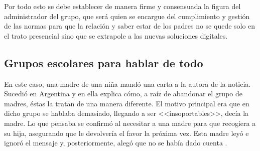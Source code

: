 Por todo esto se debe establecer de manera firme y consensuada la figura del administrador del grupo, que será quien se encargue del cumplimiento y gestión de las normas para que la relación y saber estar de los padres no se quede solo en el trato presencial sino que se extrapole a las nuevas soluciones digitales.

\subsection{Grupos escolares para hablar de todo}
En este caso, una madre de una niña mandó una carta a la autora de la noticia. Sucedió en Argentina y en ella explica cómo, a raíz de abandonar el grupo de madres, éstas la tratan de una manera diferente. El motivo principal era que en dicho grupo se hablaba demasiado, llegando a ser <<insoportables>>, decía la madre. Lo que pensaba se confirmó al necesitar a una madre para que recogiera a su hija, asegurando que le devolvería el favor la próxima vez. Esta madre leyó e ignoró el mensaje y, posteriormente, alegó que no se había dado cuenta \cite{Consuelo2017}.



%
%
%

